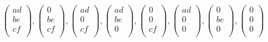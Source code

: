 \documentclass[a4paper, 12pt]{article}
\begin{document}
	$\begin{pmatrix} ad \\ be \\cf \\ \end{pmatrix},
	\begin{pmatrix} 0 \\ be \\cf \\ \end{pmatrix},
	\begin{pmatrix} ad \\ 0 \\cf \\ \end{pmatrix},
	\begin{pmatrix} ad \\ be \\0 \\ \end{pmatrix},
	\begin{pmatrix} 0 \\ 0 \\ cf \\ \end{pmatrix},
	\begin{pmatrix} ad \\ 0 \\ 0 \\ \end{pmatrix},
	\begin{pmatrix} 0 \\ be \\ 0 \\ \end{pmatrix},
	\begin{pmatrix} 0 \\ 0 \\ 0 \\ \end{pmatrix}$ \\
	
\end{document}
